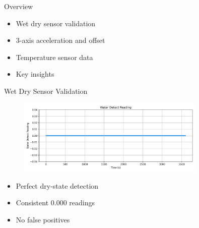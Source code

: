 \begin{frame}{Overview}
    \begin{itemize}
        \item Wet dry sensor validation
        \item 3-axis acceleration and offset
        \item Temperature sensor data
        \item Key insights
    \end{itemize}
\end{frame}


\begin{frame}{Wet Dry Sensor Validation}
    \begin{figure}
        \centering
        \includegraphics[height=1.1\textheight,width=0.8\textwidth,keepaspectratio]{images/water_detect.png}
    \end{figure}
        \begin{itemize} 
            \item Perfect dry-state detection
            \item Consistent 0.000 readings
            \item No false positives
        \end{itemize}
\end{frame}

